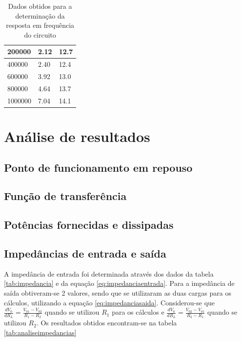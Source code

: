 \documentclass[%
  reprint,
  nofootinbib,
  amsmath,amssymb,
  aps,
  10pt,
  a4paper
]{revtex4-1}
\begin{document}
{\begin{table}[h]
\begin{tabular}{|l|l|l|}
    200000                           & 2.12  & 12.7  \\ \hline
    400000                           & 2.40  & 12.4  \\ \hline
    600000                           & 3.92  & 13.0  \\ \hline
    800000                           & 4.64  & 13.7  \\ \hline
    1000000                          & 7.04  & 14.1  \\ \hline
    \end{tabular}
\caption{Dados obtidos para a determinação da resposta em frequência do circuito}
\label{tab:respostafrequenciaresultados}
\end{table}








\section{Análise de resultados}
\label{s:aresul}
\subsection{Ponto de funcionamento em repouso}
\subsection{Função de transferência}
\subsection{Potências fornecidas e dissipadas}
\subsection{Impedâncias de entrada e saída}
A impedância de entrada foi determinada através dos dados da tabela \ref{tab:impedancia} e da equação \ref{eq:impedanciaentrada}. Para a impedância de saída obtiveram-se 2 valores, sendo que se utilizaram as duas cargas para os cálculos, utilizando a equação \ref{eq:impedanciasaida}. Considerou-se que $\frac{dV_0}{dR_L}=\frac{V_{01}-V_{02}}{R_1-R_2}$ quando se utilizou $R_1$ para os cálculos e $\frac{dV_0}{dR_L}=\frac{V_{02}-V_{01}}{R_2-R_1}$ quando se utilizou $R_2$. Os resultados obtidos encontram-se na tabela \ref{tab:analiseimpedancias}


}
\end{document}
